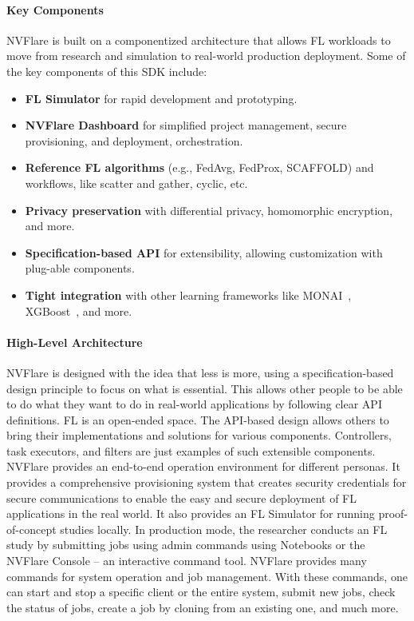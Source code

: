 \documentclass[11pt]{article}
\begin{document}
\paragraph{Key Components}
NVFlare is built on a componentized architecture that allows FL workloads to move from research and simulation to real-world production deployment. Some of the key components of this SDK include:

\begin{itemize}%
    \item \textbf{FL Simulator} for rapid development and prototyping.
    \item \textbf{NVFlare Dashboard} for simplified project management, secure provisioning, and deployment, orchestration.
    \item \textbf{Reference FL algorithms} (e.g., FedAvg, FedProx, SCAFFOLD) and workflows, like scatter and gather, cyclic, etc.
    \item \textbf{Privacy preservation} with differential privacy, homomorphic encryption, and more.
    \item \textbf{Specification-based API} for extensibility, allowing customization with plug-able components.
    \item \textbf{Tight integration} with other learning frameworks like MONAI~\cite{Holger-cardoso2022monai}, XGBoost~\cite{Holger-Chen:2016:XST:2939672.2939785}, and more.
\end{itemize}

\paragraph{High-Level Architecture} NVFlare is designed with the idea that less is more, using a specification-based design principle to focus on what is essential.
%
This allows other people to be able to do what they want to do in real-world applications by following clear API definitions. FL is an open-ended space. The API-based design allows others to bring their implementations and solutions for various components. Controllers, task executors, and filters are just examples of such extensible components.
%
NVFlare provides an end-to-end operation environment for different personas. It provides a comprehensive provisioning system that creates security credentials for secure communications to enable the easy and secure deployment of FL applications in the real world. It also provides an FL Simulator for running proof-of-concept studies locally.
%
In production mode, the researcher conducts an FL study by submitting jobs using admin commands using Notebooks or the NVFlare Console -- an interactive command tool. NVFlare provides many commands for system operation and job management. With these commands, one can start and stop a specific client or the entire system, submit new jobs, check the status of jobs, create a job by cloning from an existing one, and much more.
\end{document}
